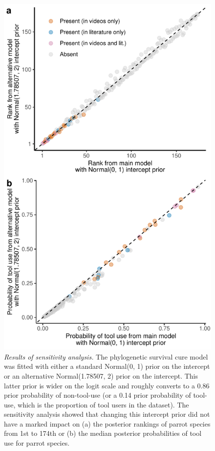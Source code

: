 \documentclass[
  man, donotrepeattitle,floatsintext]{apa6}
\begin{document}
\begin{figure}
\centering
\includegraphics{manuscript_files/figure-latex/plotSurvCure8-1.pdf}
\caption{\label{fig:plotSurvCure8}\emph{Results of sensitivity analysis.} The phylogenetic survival cure model was fitted with either a standard Normal(0, 1) prior on the intercept or an alternative Normal(1.78507, 2) prior on the intercept. This latter prior is wider on the logit scale and roughly converts to a 0.86 prior probability of non-tool-use (or a 0.14 prior probability of tool-use, which is the proportion of tool users in the dataset). The sensitivity analysis showed that changing this intercept prior did not have a marked impact on (a) the posterior rankings of parrot species from 1st to 174th or (b) the median posterior probabilities of tool use for parrot species.}
\end{figure}
\end{document}

